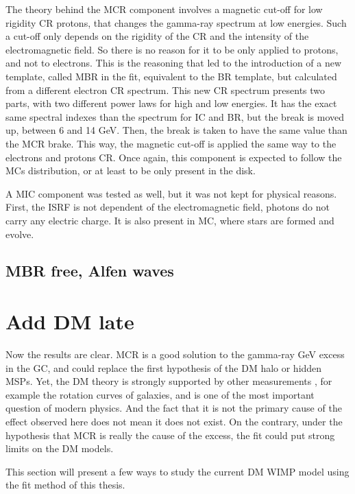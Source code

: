 The theory behind the MCR component involves a magnetic cut-off for low rigidity CR protons, that changes the gamma-ray spectrum at low energies. Such a cut-off only depends on the rigidity of the CR and the intensity of the electromagnetic field. So there is no reason for it to be only applied to protons, and not to electrons. This is the reasoning that led to the introduction of a new template, called MBR in the fit, equivalent to the BR template, but calculated from a different electron CR spectrum. This new CR spectrum presents two parts, with two different power laws for high and low energies. It has the exact same spectral indexes than the spectrum for IC and BR, but the break is moved up, between 6 and 14 GeV. Then, the break is taken to have the same value than the MCR brake. This way, the magnetic cut-off is applied the same way to the electrons and protons CR. Once again, this component is expected to follow the MCs distribution, or at least to be only present in the disk.

A MIC component was tested as well, but it was not kept for physical reasons. First, the ISRF is not dependent of the electromagnetic field, photons do not carry any electric charge. It is also present in MC, where stars are formed and evolve.

\subsection{MBR free, Alfen waves}





\section{Add DM late}


Now the results are clear. MCR is a good solution to the gamma-ray GeV excess in the GC, and could replace the first hypothesis of the DM halo or hidden MSPs. Yet, the DM theory is strongly supported by other measurements , for example the rotation curves of galaxies, and is one of the most important question of modern physics. And the fact that it is not the primary cause of the effect observed here does not mean it does not exist. On the contrary, under the hypothesis that MCR is really the cause of the excess, the fit could put strong limits on the DM models.

This section will present a few ways to study the current DM WIMP model using the fit method of this thesis.

